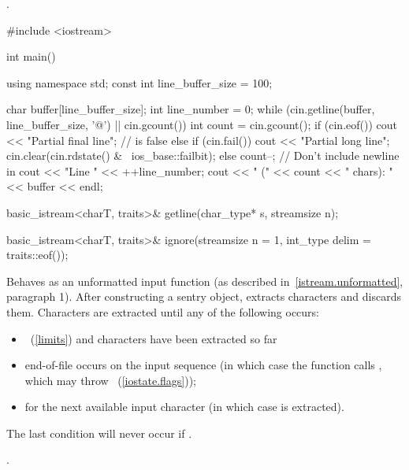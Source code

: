 \begin{itemdescr}
\pnum
\returns
{}.

\pnum
\enterexample
\begin{codeblock}
#include <iostream>

int main() {
  using namespace std;
  const int line_buffer_size = 100;

  char buffer[line_buffer_size];
  int line_number = 0;
  while (cin.getline(buffer, line_buffer_size, '@\textbackslash@n') || cin.gcount()) {
    int count = cin.gcount();
    if (cin.eof())
      cout << "Partial final line";   //  is false
    else if (cin.fail()) {
      cout << "Partial long line";
      cin.clear(cin.rdstate() & ~ios_base::failbit);
    } else {
      count--;                        // Don't include newline in 
      cout << "Line " << ++line_number;
    }
    cout << " (" << count << " chars): " << buffer << endl;
  }
}
\end{codeblock}
\exitexample
\end{itemdescr}

%
\begin{itemdecl}
basic_istream<charT, traits>& getline(char_type* s, streamsize n);
\end{itemdecl}

\begin{itemdescr}
\pnum
\returns
{}
\end{itemdescr}

%
\begin{itemdecl}
basic_istream<charT, traits>&
    ignore(streamsize n = 1, int_type delim = traits::eof());
\end{itemdecl}

\begin{itemdescr}
\pnum
\effects
Behaves as an unformatted input function
(as described in~\ref{istream.unformatted}, paragraph 1).
After constructing a sentry object, extracts
characters and discards them.
Characters are extracted until any of the following occurs:
\begin{itemize}
\item
{}~(\ref{limits})
and
 characters have been extracted so far
\item
end-of-file occurs on the input sequence
(in which case the function calls
,
which may throw
~(\ref{iostate.flags}));
\item
{}
for the next available input character 
(in which case  is extracted).
\end{itemize}

\pnum
\remarks
The last condition will never occur if
.

\pnum
\returns
{}.
\end{itemdescr}

